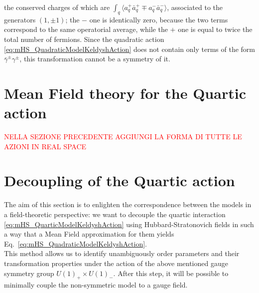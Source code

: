\documentclass[a4paper,11pt, english]{article}
\theoremstyle{remark}
\newcommand{\mean}[1]{\ensuremath{\langle #1 \rangle}}
\newcommand{\nline}{\\[0.3cm]}
\newcommand{\nsec}{\vskip 0.8cm}
\begin{document}
 the conserved charges of which are $\displaystyle \int_q \mean{a^+_q\bar{a}^+_q  \mp  a^-_q\bar{a}^-_q}  $, associated to the generators $(1,\pm 1)$; the $-$ one is identically zero, because the two terms correspond to the same operatorial average, while the $+$ one is equal to twice the total number of fermions. Since the quadratic action \eqref{eq:mHS_QuadraticModelKeldyshAction} does not contain only terms of the form $\bar{\gamma}^{\pm}\gamma^{\pm}$, this transformation cannot be a symmetry of it.
\nsec

\section{Mean Field theory for the Quartic action}
\textcolor{red}{NELLA SEZIONE PRECEDENTE AGGIUNGI LA FORMA DI TUTTE LE AZIONI IN REAL SPACE}

\section{Decoupling of the Quartic action}
The aim of this section is to enlighten the correspondence between the models in a field-theoretic perspective: we want to decouple the quartic interaction \eqref{eq:mHS_QuarticModelKeldyshAction} using Hubbard-Stratonovich fields in such a way that a Mean Field approximation for them yields Eq.~\eqref{eq:mHS_QuadraticModelKeldyshAction}.\\ 
This method allows us to identify unambiguously order parameters and their transformation properties under the action of the above mentioned gauge symmetry group $U(1)_+ \times U(1)_-$. After this step, it will be possible to minimally couple the non-symmetric model to a gauge field.\nsec

% 
% 
\end{document}
